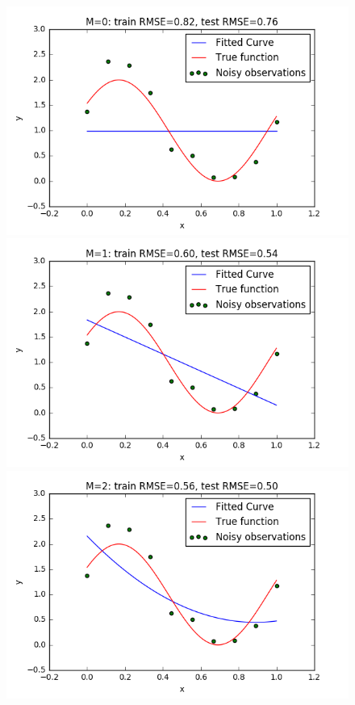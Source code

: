 \documentclass[a4paper]{article}
\begin{document}
\begin{figure}[h!]
\begin{multicols}{2}
    \includegraphics[width=\linewidth]{Images/curvefit_m0_n_10.png}\par 
    \includegraphics[width=\linewidth]{Images/curvefit_m1_n_10.png}\par 
    \end{multicols}
\begin{multicols}{2}
    \includegraphics[width=\linewidth]{Images/curvefit_m2_n_10.png}\par

\end{multicols}
\end{figure}
\end{document}

